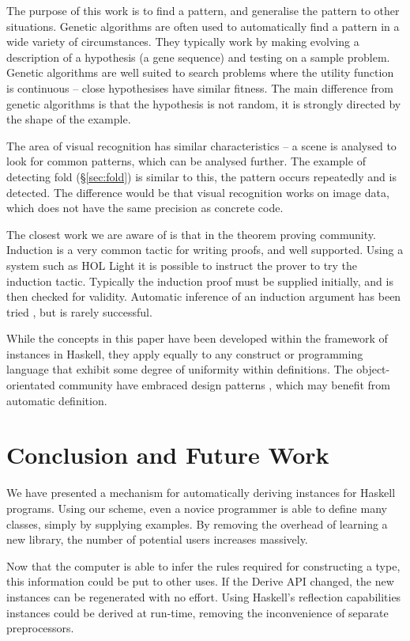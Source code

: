 \documentclass{llncs}
\begin{document}
The purpose of this work is to find a pattern, and generalise the pattern to other situations. Genetic algorithms \cite{genetic:algorithms} are often used to automatically find a pattern in a wide variety of circumstances. They typically work by making evolving a description of a hypothesis (a gene sequence) and testing on a sample problem. Genetic algorithms are well suited to search problems where the utility function is continuous -- close hypothesises have similar fitness. The main difference from genetic algorithms is that the hypothesis is not random, it is strongly directed by the shape of the example.

The area of visual recognition has similar characteristics -- a scene is analysed to look for common patterns, which can be analysed further. The example of detecting fold (\S\ref{sec:fold}) is similar to this, the pattern occurs repeatedly and is detected. The difference would be that visual recognition works on image data, which does not have the same precision as concrete code.

The closest work we are aware of is that in the theorem proving community. Induction is a very common tactic for writing proofs, and well supported. Using a system such as HOL Light \cite{hol_light} it is possible to instruct the prover to try the induction tactic. Typically the induction proof must be supplied initially, and is then checked for validity. Automatic inference of an induction argument has been tried \cite{mintchev:reasoning}, but is rarely successful.

While the concepts in this paper have been developed within the framework of instances in Haskell, they apply equally to any construct or programming language that exhibit some degree of uniformity within definitions. The object-orientated community have embraced design patterns \cite{design_patterns}, which may benefit from automatic definition.

\section{Conclusion and Future Work}
\label{sec:conclusion}

We have presented a mechanism for automatically deriving instances for Haskell programs. Using our scheme, even a novice programmer is able to define many classes, simply by supplying examples. By removing the overhead of learning a new library, the number of potential users increases massively.

Now that the computer is able to infer the rules required for constructing a type, this information could be put to other uses. If the Derive API changed, the new instances can be regenerated with no effort. Using Haskell's reflection capabilities instances could be derived at run-time, removing the inconvenience of separate preprocessors.




\end{document}
